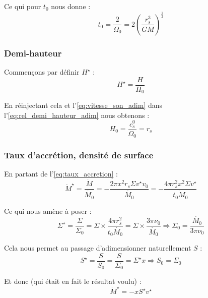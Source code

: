 Ce qui pour $t_0$ nous donne :
\begin{equation}
    t_0 = \frac{2}{\Omega_0} = 2 \left( \frac{r_s^3}{G M} \right)^\frac{1}{2}
\end{equation}    

\subsubsection{Demi-hauteur}

Commençons par définir $H^\star$ :
\begin{equation}
    H^\star = \frac{H}{H_0}
\end{equation}

En réinjectant cela et l’\cref{eq:vitesse_son_adim} dans
l’\cref{eq:rel_demi_hauteur_adim} nous obtenons :
\begin{equation}
    \label{eq:demi_hauteur_adim}
    H_0 = \frac{c_s^0}{\Omega_0} = r_s
\end{equation}

\subsubsection{Taux d’accrétion, densité de surface}

En partant de l’\cref{eq:taux_accretion} :
\begin{equation}
    \dot{M}^\star = \frac{\dot{M}}{\dot{M_0}} = - \frac{2 \pi x^2 r_s \Sigma v^\star v_0}{\dot{M_0}} = - \frac{4 \pi r_s^2 x^2 \Sigma v^\star}{\dot{t_0 M_0}}
\end{equation}

Ce qui nous amène à poser :
\begin{equation}
    \label{eq:densite_surface_adim}
    \Sigma^\star = \frac{\Sigma}{\Sigma_0} = \Sigma \times \frac{4 \pi r_s^2}{t_0 \dot{M_0}} = \Sigma \times \frac{3 \pi \nu_0}{\dot{M_0}} \Rightarrow \Sigma_0 = \frac{\dot{M_0}}{3 \pi \nu_0}
\end{equation}

Cela nous permet au passage d’adimensionner naturellement $S$ :
\begin{equation}
    S^\star = \frac{S}{S_0} = \frac{S}{\Sigma_0} = \Sigma^\star x \Rightarrow S_0 = \Sigma_0
\end{equation}

Et donc (qui était en fait le résultat voulu) :
\begin{equation}
    \dot{M}^\star = - x S^\star v^\star
\end{equation}

